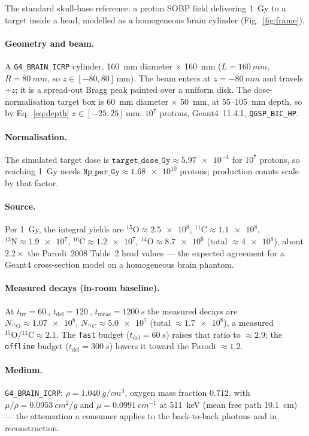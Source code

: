 \documentclass[11pt]{article}
\newcommand{\Cl}[1]{{}^{#1}\mathrm{C}}
\newcommand{\Ox}[1]{{}^{#1}\mathrm{O}}
\newcommand{\Nt}[1]{{}^{#1}\mathrm{N}}
\newcommand{\tirr}{t_{\mathrm{irr}}}
\newcommand{\tdel}{t_{\mathrm{del}}}
\newcommand{\tmeas}{t_{\mathrm{meas}}}
\newcommand{\file}[1]{\texttt{#1}}
\begin{document}
The standard skull-base reference: a proton SOBP field delivering \SI{1}{Gy} to a
target inside a head, modelled as a homogeneous brain cylinder
(Fig.~\ref{fig:frame}).

\paragraph{Geometry and beam.} A \file{G4\_BRAIN\_ICRP} cylinder, \SI{160}{mm}
diameter $\times$ \SI{160}{mm} ($L=\SI{160}{mm}$, $R=\SI{80}{mm}$, so
$z\in[-80,80]\,$\si{mm}). The beam enters at $z=-\SI{80}{mm}$ and travels $+z$; it
is a spread-out Bragg peak painted over a uniform disk. The dose-normalisation
target box is \SI{60}{mm} diameter $\times$ \SI{50}{mm}, at \SI{55}{}--\SI{105}{mm}
depth, so by Eq.~\eqref{eq:depth} $z\in[-25,25]\,$\si{mm}. $10^{7}$ protons,
Geant4~11.4.1, \file{QGSP\_BIC\_HP}.

\paragraph{Normalisation.} The simulated target dose is
$\file{target\_dose\_Gy}\approx\num{5.97e-4}$ for $10^{7}$ protons, so reaching
\SI{1}{Gy} needs $\file{Np\_per\_Gy}\approx\num{1.68e10}$ protons; production counts
scale by that factor.

\paragraph{Source.} Per \SI{1}{Gy}, the integral yields are
$\Ox{15}\approx\num{2.5e8}$, $\Cl{11}\approx\num{1.1e8}$,
$\Nt{13}\approx\num{1.9e7}$, $\Cl{10}\approx\num{1.2e7}$,
$\Ox{14}\approx\num{8.7e6}$ (total $\approx\num{4e8}$), about $2.2\times$ the
Parodi~2008 Table~2 head values --- the expected agreement for a Geant4
cross-section model on a homogeneous brain phantom.

\paragraph{Measured decays (in-room baseline).} At $\tirr=\SI{60}{}$,
$\tdel=\SI{120}{}$, $\tmeas=\SI{1200}{s}$ the measured decays are
$N_{\Ox{15}}\approx\num{1.07e8}$, $N_{\Cl{11}}\approx\num{5.0e7}$ (total
$\approx\num{1.7e8}$), a measured $\Ox{15}/\Cl{11}\approx 2.1$. The \file{fast}
budget ($\tdel=\SI{60}{s}$) raises that ratio to $\approx 2.9$; the \file{offline}
budget ($\tdel=\SI{300}{s}$) lowers it toward the Parodi $\approx1.2$.

\paragraph{Medium.} \file{G4\_BRAIN\_ICRP}: $\rho=\SI{1.040}{g/cm^3}$, oxygen mass
fraction $0.712$, with $\mu/\rho=\SI{0.0953}{cm^2/g}$ and $\mu=\SI{0.0991}{cm^{-1}}$
at \SI{511}{keV} (mean free path \SI{10.1}{cm}) --- the attenuation a consumer
applies to the back-to-back photons and in reconstruction.
\end{document}
